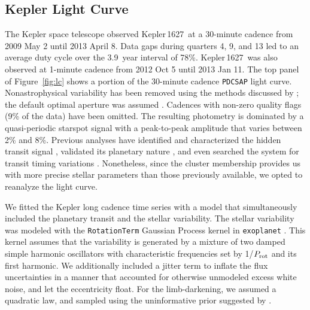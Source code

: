 \documentclass[12pt,modern,twocolumn,tighten]{aastex63}
\newcommand{\sn}{Kepler\,1627} %
\begin{document}
\subsection{Kepler Light Curve}

The Kepler space telescope observed \sn\ at a 30-minute cadence from
2009 May 2 until 2013 April 8.  Data gaps during quarters 4, 9, and 13
led to an average duty cycle over the 3.9~year interval of 78\%.  \sn\
was also observed at 1-minute cadence from 2012 Oct 5 until 2013 Jan
11.  The top panel of Figure~\ref{fig:lc} shows a portion of the 30-minute
cadence \texttt{PDCSAP} light curve.  Nonastrophysical variability has
been removed using the methods discussed by
\citet{smith_kepler_PDC_2017}; the default optimal aperture was
assumed \citep{smith_finding_2016}. 
Cadences with non-zero quality flags (9\% of the data) have been omitted.
 The resulting photometry is dominated by
a quasi-periodic starspot signal with a peak-to-peak amplitude that
varies between 2\% and 8\%.  
Previous analyses have identified and
characterized the hidden transit signal
\citep{2012ApJS..199...24T,thompson_planetary_2018}, validated its
planetary nature \citep{morton_false_2016}, and even searched the
system for transit timing variations \citep{holczer_transit_2016}.
Nonetheless, since the cluster membership provides us
with more precise stellar parameters than those previously available,
we opted to reanalyze the
light curve.

We fitted the Kepler long cadence time series with a model that
simultaneously included the planetary transit and the stellar
variability.  The stellar variability was modeled with the
\texttt{RotationTerm} Gaussian Process kernel in \texttt{exoplanet}
\citep{exoplanet:exoplanet}.  This kernel assumes that the variability
is generated by a mixture of two damped simple harmonic oscillators
with characteristic frequencies set by 1/$P_{\rm rot}$ and its first
harmonic.  We additionally included a jitter term to inflate
the flux uncertainties in a manner that accounted for otherwise
unmodeled excess white noise, and let the eccentricity float.  For
the limb-darkening, we assumed a quadratic law, and sampled using the
uninformative prior suggested by \citet{exoplanet:kipping13}.
\end{document}
